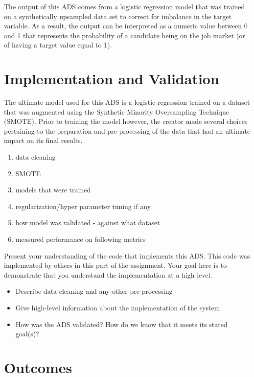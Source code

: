 \documentclass[11pt]{article}
\begin{document}
The output of this ADS comes from a logistic regression model that was trained on a synthetically upsampled data set to correct for imbalance in the target variable.  As a result, the output can be interpreted as a numeric value between 0 and 1 that represents the probability of a candidate being on the job market (or of having a target value equal to 1).



\pagebreak

\section{Implementation and Validation}

The ultimate model used for this ADS is a logistic regression trained on a dataset that was augmented using the Synthetic Minority Oversampling Technique (SMOTE).  Prior to training the model however, the creator made several choices pertaining to the preparation and pre-processing of the data that had an ultimate impact on its final results.

\begin{enumerate}
	\item data cleaning
	\item SMOTE
	\item models that were trained
	\item regularization/hyper parameter tuning if any
	\item how model was validated - against what dataset
	\item measured performance on following metrics
\end{enumerate}



Present your understanding of the code that implements this ADS.  This code was implemented by others in this part of the assignment.  Your goal here is to demonstrate that you understand the implementation at a high level.
\begin{itemize}
\item Describe data cleaning and any other pre-processing
\item Give high-level information about the implementation of the system
\item How was the ADS validated?  How do we know that it meets its stated goal(s)?
\end{itemize}

\pagebreak

\section{Outcomes}
\end{document}
